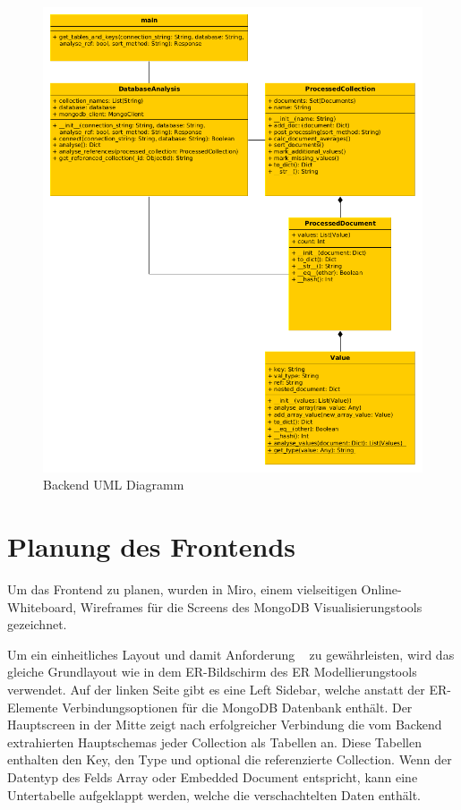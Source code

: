 \begin{figure}[H]
    \includegraphics[width=\textwidth]{images/backend_uml}
    \caption{Backend UML Diagramm}
    \label{fig:backend_uml}
\end{figure}

\section{Planung des Frontends}
\label{sec:planung_frontend}

Um das Frontend zu planen, wurden in Miro, einem vielseitigen Online-Whiteboard, Wireframes für die Screens des MongoDB Visualisierungstools gezeichnet.

Um ein einheitliches Layout und damit Anforderung ~ zu gewährleisten, wird das gleiche Grundlayout wie in dem ER-Bildschirm des ER Modellierungstools verwendet.
Auf der linken Seite gibt es eine Left Sidebar, welche anstatt der ER-Elemente Verbindungsoptionen für die MongoDB Datenbank enthält. 
Der Hauptscreen in der Mitte zeigt nach erfolgreicher Verbindung die vom Backend extrahierten Hauptschemas jeder Collection als Tabellen an.
Diese Tabellen enthalten den Key, den Type und optional die referenzierte Collection.
Wenn der Datentyp des Felds Array oder Embedded Document entspricht, kann eine Untertabelle aufgeklappt werden, welche die verschachtelten Daten enthält.

